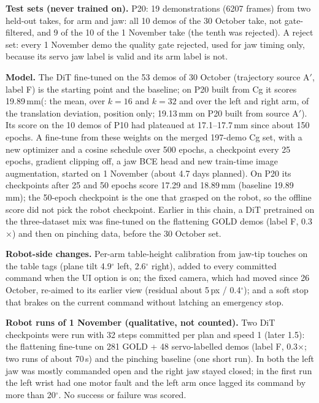 \documentclass[conference,10pt]{IEEEtran}
\newcommand{\mm}{\,mm\xspace}
\begin{document}
\textbf{Test sets (never trained on).} P20: 19 demonstrations (6207 frames) from two held-out takes, for arm and jaw:
all 10 demos of the 30 October take, not gate-filtered, and 9 of the 10 of the 1 November take (the tenth was
rejected). A reject set: every 1 November demo the quality gate rejected, used for jaw timing only,
because its servo jaw label is valid and its arm label is not.

\textbf{Model.} The DiT fine-tuned on the 53 demos of 30 October (trajectory source A$'$, label F) is the starting point
and the baseline; on P20 built from Cg it scores 19.89\mm (: the mean, over $k=16$ and $k=32$ and
over the left and right arm, of the translation deviation, position only; 19.13\mm on P20 built from source A$'$). Its score on the 10 demos of P10 had plateaued at 17.1--17.7\mm
since about 150 epochs. A fine-tune from these weights on the merged 197-demo Cg set, with a new optimizer and a cosine schedule
over 500 epochs, a checkpoint every 25 epochs, gradient clipping off, a jaw BCE head and new train-time image
augmentation, started on 1 November (about 4.7 days planned). On P20 its checkpoints after 25 and 50 epochs score
17.29 and 18.89\mm{} (baseline 19.89\mm); the 50-epoch checkpoint is the one that grasped on the robot, so the offline
score did not pick the robot checkpoint. Earlier in this chain, a DiT
pretrained on the three-dataset mix was fine-tuned on the flattening GOLD demos (label F, 0.3$\times$) and then on
pinching data, before the 30 October set.

\textbf{Robot-side changes.} Per-arm table-height calibration from jaw-tip touches on the table tags (plane tilt
4.9$^\circ$ left, 2.6$^\circ$ right), added to every committed command when the UI option is on; the fixed camera, which had moved since
26 October, re-aimed to its earlier view (residual about 5\,px / 0.4$^\circ$); and a soft stop that brakes on the current
command without latching an emergency stop.

\textbf{Robot runs of 1 November (qualitative, not counted).} Two DiT checkpoints were run with 32 steps committed per
plan and speed 1 (later 1.5): the flattening fine-tune on 281 GOLD + 48 servo-labelled demos (label F, 0.3$\times$; two
runs of about 70\,s) and the pinching baseline (one short run). In both the left jaw was mostly commanded open and the
right jaw stayed closed; in the first run the left wrist had one motor fault and the left arm once lagged its command by
more than 20$^\circ$. No success or failure was scored.
\end{document}
